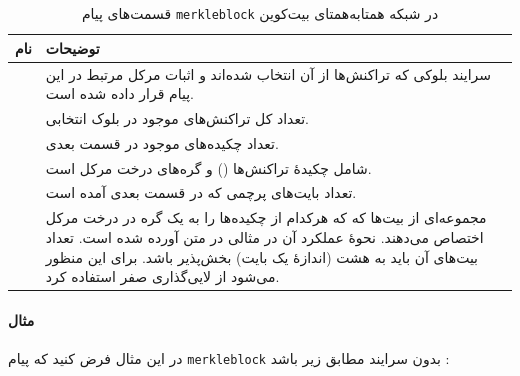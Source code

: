\begin{xltabular}{\textwidth}{|c|X|}
	\caption{
		قسمت‌های پیام \texttt{merkleblock} در شبکه همتا‌به‌همتای بیت‌کوین
		\label{table:merkleblockMessage}}\\
	\hline
	\textbf{نام} & {\textbf{توضیحات}} \\
	\hline \hline
	 & {%
سرایند بلوکی که تراکنش‌ها از آن انتخاب شده‌اند و اثبات مرکل مرتبط در این پیام قرار داده شده‌ است.	
}\\
\hline

	 & {%
	تعداد کل تراکنش‌های موجود در بلوک انتخابی.
}\\
\hline

	 & {%
	تعداد چکیده‌های موجود در قسمت بعدی.
}\\
\hline

	 & {%
	شامل چکیده‌ٔ تراکنش‌ها () و گره‌های درخت مرکل است.
}\\
\hline

	 & {%
	تعداد بایت‌های پرچمی که در قسمت بعدی آمده است.
}\\
\hline

	 & {%
مجموعه‌ای از بیت‌ها که که هرکدام از چکیده‌ها را به یک گره در درخت مرکل اختصاص می‌دهند. نحوهٔ عملکرد آن در مثالی در متن آورده شده است. تعداد بیت‌های آن باید به هشت (اندازهٔ یک بایت) بخش‌پذیر باشد. برای این منظور می‌شود از لایی‌گذاری صفر استفاده کرد.
}\\
\hline
\end{xltabular}

\paragraph{مثال}
در این مثال فرض کنید که پیام \texttt{merkleblock} بدون سرایند مطابق زیر باشد \cite{P2P_ref}:

